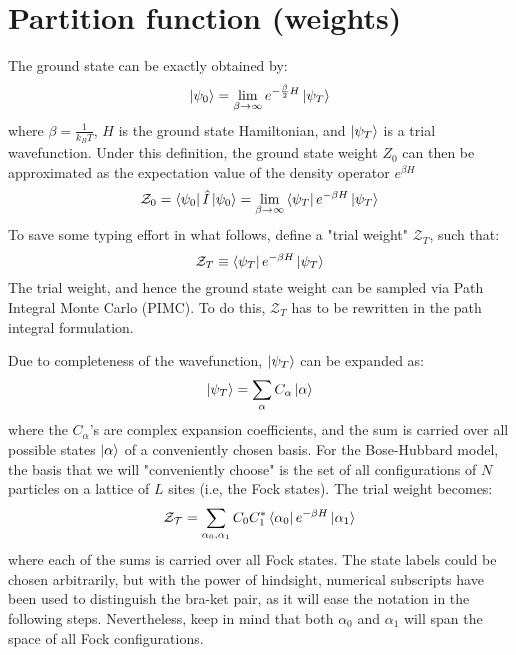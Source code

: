 \documentclass[12pt, two sided]{article}
\begin{document}
\section{Partition function (weights)}

The ground state can be exactly obtained by:
%
\begin{equation}
\ket{\psi_0} = \lim_{\beta\to\infty} e^{-\frac{\beta}{2} H}\ket{\psi_T} 
\end{equation}
%
where $\beta = \frac{1}{k_B  T}$, $H$ is the ground state Hamiltonian, and $\ket{\psi_T}$ is a trial wavefunction. Under this definition, the ground state weight $Z_0$ can then be approximated as the expectation value of the density operator $e^{\beta H}$
%
\begin{equation}
\label{eq:z_0_01}
\mathcal{Z}_0 = \bra{\psi_0} \hat{I} \ket{\psi_0} = \lim_{\beta\to\infty} \bra{\psi_T} e^{-\beta H} \ket{\psi_T}
\end{equation}
%
To save some typing effort in what follows, define a "trial weight" $\mathcal{Z}_T$, such that:
%
\begin{equation}
\mathcal{Z}_T \equiv  \bra{\psi_T} e^{-\beta H} \ket{\psi_T}
\end{equation}
%
The trial weight, and hence the ground state weight can be sampled via Path Integral Monte Carlo (PIMC). To do this, $\mathcal{Z}_T$ has to be rewritten in the path integral formulation.

Due to completeness of the wavefunction, $\ket{\psi_T}$ can be expanded as:
%
\begin{equation}
\ket{\psi_T} = \sum_{\alpha} C_{\alpha} \ket{\alpha}
\end{equation}
%
where the $C_\alpha$'s are complex expansion coefficients, and the sum is carried over all possible states $\ket{\alpha}$ of a conveniently chosen basis. For the Bose-Hubbard model, the basis that we will "conveniently choose" is the set of all configurations of $N$ particles on a lattice of $L$ sites (i.e, the Fock states). The trial weight becomes:
%
\begin{equation}
\mathcal{Z_T} = \sum_{\alpha_0, \alpha_1} C_0 C_1^{*} \bra{\alpha_0} e^{-\beta H} \ket{\alpha_1}
\end{equation}
%
where each of the sums is carried over all Fock states. The state labels could be chosen arbitrarily, but with the power of hindsight, numerical subscripts have been used to distinguish the bra-ket pair, as it will ease the notation in the following steps. Nevertheless, keep in mind that both $\alpha_0$ and $\alpha_1$ will span the space of all Fock configurations.
\end{document}
